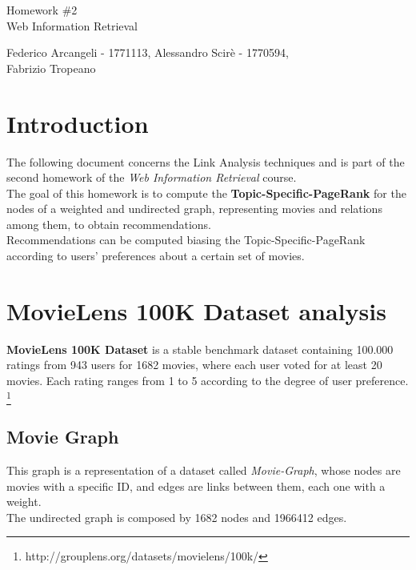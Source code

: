 \documentclass[11pt]{article}
\begin{document}
\begin{titlepage}
	\begin{center}
		\vspace*{\fill}
		\begin{Huge}
			Homework \#2\\
			Web Information Retrieval
		\end{Huge}
		\newline
		\newline
		Federico Arcangeli \-- 1771113, Alessandro Scir\`{e} \-- 1770594,\\
		Fabrizio Tropeano 
		\vspace*{\fill}	
	\end{center}
\end{titlepage}
\section{Introduction}
The following document concerns the Link Analysis techniques and is part of the second homework
of the \textit{Web Information Retrieval} course.\\
The goal of this homework is to compute the \textbf{Topic-Specific-PageRank} for the nodes of
a weighted and undirected graph, representing movies and relations among them, to obtain recommendations.\\
Recommendations can be computed biasing the Topic-Specific-PageRank according to users' preferences about
a certain set of movies.

\section{MovieLens 100K Dataset analysis}
\textbf{MovieLens 100K Dataset} is a stable benchmark dataset containing
 100.000 ratings from 943 users for 1682 movies, where each user voted for at least 20 movies.
 Each rating ranges from 1 to 5 according to the degree of user preference.
 \footnote{http://grouplens.org/datasets/movielens/100k/} \\
\subsection{Movie Graph}
This graph is a representation of a dataset called \textit{Movie\--Graph}, whose nodes are movies
with a specific ID, and edges are links between them, each one with a weight.\\
The undirected graph is composed by 1682 nodes and 1966412 edges.
\end{document}
